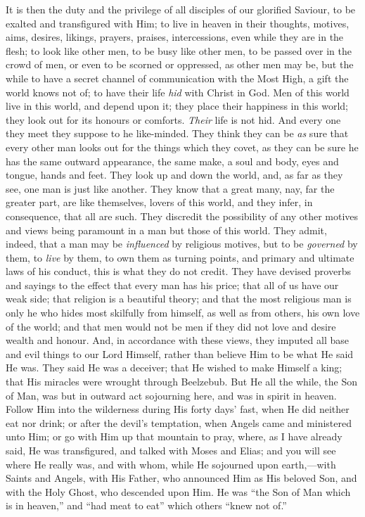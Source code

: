 It is then the duty and the privilege of all disciples of our
glorified Saviour, to be exalted and transfigured with Him; to live in
heaven in their thoughts, motives, aims, desires, likings, prayers,
praises, intercessions, even while they are in the flesh; to look like
other men, to be busy like other men, to be passed over in the crowd
of men, or even to be scorned or oppressed, as other men may be, but
the while to have a secret channel of communication with the Most
High, a gift the world knows not of; to have their life \emph{hid}
with Christ in God. Men of this world live in this world, and depend
upon it; they place their happiness in this world; they look out for
its honours or comforts. \emph{Their} life is not hid. And every one
they meet they suppose to he like-minded. They think they can be \emph{as}
sure that every other man looks out for the things which they covet,
as they can be sure he has the same outward appearance, the same make,
a soul and body, eyes and tongue, hands and feet. They look up and
down the world, and, as far as they see, one man is just like another.
They know that a great many, nay, far the greater part, are like
themselves, lovers of this world, and they infer, in consequence, that
all are such. They discredit the possibility of any other motives and
views being paramount in a man but those of this world. They admit,
indeed, that a man may be \emph{influenced} by religious motives, but
to be \emph{governed} by them, to \emph{live} by them, to own them as
turning points, and primary and ultimate laws of his conduct, this is
what they do not credit. They have devised proverbs and sayings to the
effect that every man has his price; that all of us have our weak
side; that religion is a beautiful theory; and that the most religious
man is only he who hides most skilfully from himself, as well as from
others, his own love of the world; and that men would not be men if
they did not love and desire wealth and honour. And, in accordance
with these views, they imputed all base and evil things to our Lord
Himself, rather than believe Him to be what He said He was. They said
He was a deceiver; that He wished to make Himself a king; that His
miracles were wrought through Beelzebub. But He all the while, the Son
of Man, was but in outward act sojourning here, and was in spirit in
heaven. Follow Him into the wilderness during His forty days' fast,
when He did neither eat nor drink; or after the devil's temptation,
when Angels came and ministered unto Him; or go with Him up that
mountain to pray, where, as I have already said, He was transfigured,
and talked with Moses and Elias; and you will see where He really was,
and with whom, while He sojourned upon earth,—with Saints and
Angels, with His Father, who announced Him as His beloved Son, and
with the Holy Ghost, who descended upon Him. He was ``the Son of
Man which is in heaven,'' and ``had meat to eat'' which
others ``knew not of.''

